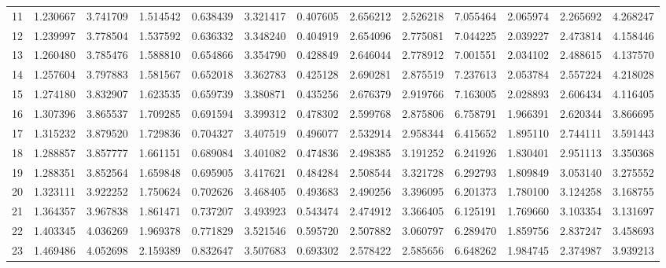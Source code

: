 \begin{tabular}{lrrrrrrrrrrrr}
11 & 1.230667 & 3.741709 & 1.514542 & 0.638439 & 3.321417 & 0.407605 & 2.656212 & 2.526218 & 7.055464 & 2.065974 & 2.265692 & 4.268247 \\
12 & 1.239997 & 3.778504 & 1.537592 & 0.636332 & 3.348240 & 0.404919 & 2.654096 & 2.775081 & 7.044225 & 2.039227 & 2.473814 & 4.158446 \\
13 & 1.260480 & 3.785476 & 1.588810 & 0.654866 & 3.354790 & 0.428849 & 2.646044 & 2.778912 & 7.001551 & 2.034102 & 2.488615 & 4.137570 \\
14 & 1.257604 & 3.797883 & 1.581567 & 0.652018 & 3.362783 & 0.425128 & 2.690281 & 2.875519 & 7.237613 & 2.053784 & 2.557224 & 4.218028 \\
15 & 1.274180 & 3.832907 & 1.623535 & 0.659739 & 3.380871 & 0.435256 & 2.676379 & 2.919766 & 7.163005 & 2.028893 & 2.606434 & 4.116405 \\
16 & 1.307396 & 3.865537 & 1.709285 & 0.691594 & 3.399312 & 0.478302 & 2.599768 & 2.875806 & 6.758791 & 1.966391 & 2.620344 & 3.866695 \\
17 & 1.315232 & 3.879520 & 1.729836 & 0.704327 & 3.407519 & 0.496077 & 2.532914 & 2.958344 & 6.415652 & 1.895110 & 2.744111 & 3.591443 \\
18 & 1.288857 & 3.857777 & 1.661151 & 0.689084 & 3.401082 & 0.474836 & 2.498385 & 3.191252 & 6.241926 & 1.830401 & 2.951113 & 3.350368 \\
19 & 1.288351 & 3.852564 & 1.659848 & 0.695905 & 3.417621 & 0.484284 & 2.508544 & 3.321728 & 6.292793 & 1.809849 & 3.053140 & 3.275552 \\
20 & 1.323111 & 3.922252 & 1.750624 & 0.702626 & 3.468405 & 0.493683 & 2.490256 & 3.396095 & 6.201373 & 1.780100 & 3.124258 & 3.168755 \\
21 & 1.364357 & 3.967838 & 1.861471 & 0.737207 & 3.493923 & 0.543474 & 2.474912 & 3.366405 & 6.125191 & 1.769660 & 3.103354 & 3.131697 \\
22 & 1.403345 & 4.036269 & 1.969378 & 0.771829 & 3.521546 & 0.595720 & 2.507882 & 3.060797 & 6.289470 & 1.859756 & 2.837247 & 3.458693 \\
23 & 1.469486 & 4.052698 & 2.159389 & 0.832647 & 3.507683 & 0.693302 & 2.578422 & 2.585656 & 6.648262 & 1.984745 & 2.374987 & 3.939213 \\
\bottomrule
\end{tabular}
